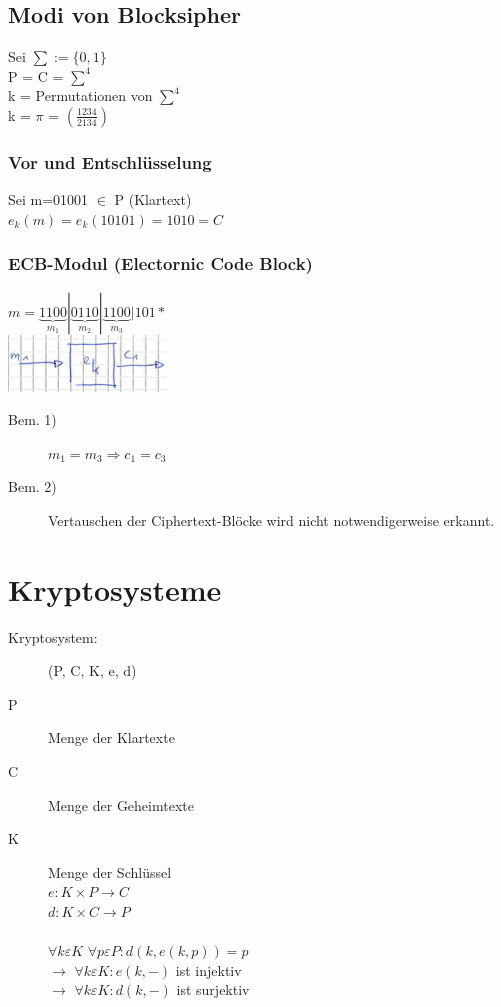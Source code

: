 \documentclass[10pt]{article}
\newcommand{\ra}{\rightarrow}
\begin{document}
\subsection{Modi von Blocksipher}
Sei $\sum := \{0,1\}$ \\
P = C = $\sum^4$ \\
k = Permutationen von $\sum^4$ \\
k = $\pi$ = $(\frac{1 2 3 4}{2 1 3 4})$

\subsubsection*{Vor und Entschlüsselung}
Sei m=01001 $\in$ P (Klartext) \\
$e_k(m)=e_k(10101)=1010=C$

\subsubsection{ECB-Modul (Electornic Code Block)}
$m=\underbrace{1100}_{m_1}|\underbrace{0110}_{m_2} | \underbrace{1100}_{m_3} | 101*$ \\
\includegraphics[scale=0.5]{ECB-modus.png}
\begin{description}
	\item[Bem. 1)] $m_1=m_3\Rightarrow c_1=c_3$
	\item[Bem. 2)] Vertauschen der Ciphertext-Blöcke wird nicht notwendigerweise erkannt.
\end{description}



\newpage
\section{Kryptosysteme}
\begin{description}
	\item[Kryptosystem:] (P, C, K, e, d)
	\item[P] Menge der {\color{blue}Klartexte}
	\item[C] Menge der {\color{red}Geheimtexte}
	\item[K] Menge der Schlüssel \\
		$e:K\times P \ra C$ \\
		$d:K\times C \ra P$ \\ \\
		$\forall k \varepsilon K$ $\forall p \varepsilon P: d( k, e (k,p))=p$ \\
		$\ra$ $\forall k \varepsilon K : e (k,-)$ ist {\color{blue}injektiv} \\
		$\ra$ $\forall k \varepsilon K : d (k,-)$ ist {\color{red}surjektiv} \\
\end{description}
\end{document}
